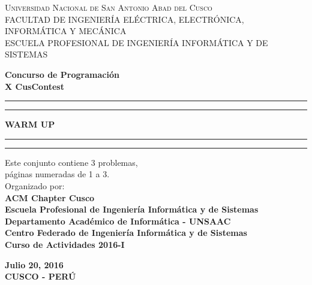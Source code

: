 \documentclass[12pt,oneside,a4paper]{book}
\theoremstyle{definition}
\begin{document}
\vspace*{1in}
\begin{center}
\textsc{\large Universidad Nacional de San Antonio Abad del Cusco}\\\vspace*{0.04in}
\textsc{FACULTAD DE INGENIERÍA ELÉCTRICA, ELECTRÓNICA, INFORMÁTICA Y MECÁNICA}\\
\vspace*{0.04in}
ESCUELA PROFESIONAL DE INGENIERÍA INFORMÁTICA Y DE SISTEMAS \\
\captionsetup[figure]{labelformat=empty}

\vspace*{2in}
\newcommand{\topline}{
\rule{164.7mm}{2mm}
\vspace*{-0.18in}
\hrule
}
\newcommand{\downline}{
\hrule
\vspace*{0.02in}
\rule{164.7mm}{2mm}
}
\vspace*{-0.6in}
\textbf{Concurso de Programación}\\
\textbf{X CusContest}\\
\vspace*{0.8in}
\topline
\vspace*{0.1in}
\begin{large}
\textbf{WARM UP} \\
\end{large}
\vspace*{0.08in}
\downline
\vspace*{0.55in}

\begin{minipage}{\linewidth}
\large
\begin{minipage}{0.45\linewidth}
\end{minipage}
\hspace{0.28\linewidth}
\begin{minipage}{0.8\linewidth}
\begin{normalsize}
Este conjunto contiene 3 problemas,\\ páginas numeradas de 1 a 3.\vspace*{0.3in}
\\Organizado por:\vspace*{-0.05in}
\\\textbf{ACM Chapter Cusco}
\\\textbf{Escuela Profesional de Ingeniería Informática y de Sistemas}
\\\textbf{Departamento Académico de Informática - UNSAAC}
\\\textbf{Centro Federado de Ingeniería Informática y de Sistemas}
\\\textbf{Curso de Actividades 2016-I}

\vspace*{1.0in}
\end{normalsize}
\end{minipage}
\end{minipage}
\vspace*{0.6in}
{
\textbf{Julio 20, 2016}\\ \vspace*{-0.6in}
\textbf{CUSCO - PERÚ}
}
\end{center}
\end{document}
